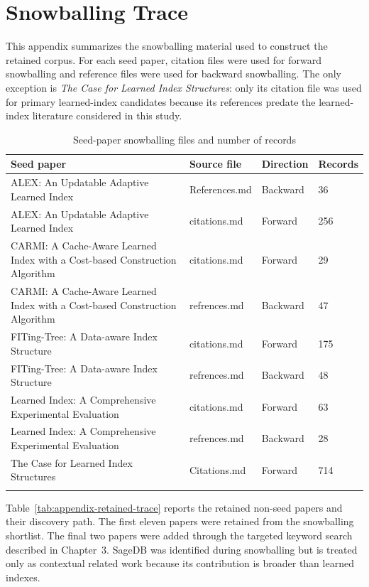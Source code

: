 \documentclass[a4paper, 12pt, twoside]{report}
\begin{document}
\section{Snowballing Trace}

This appendix summarizes the snowballing material used to construct the retained corpus. For each seed paper, citation files were used for forward snowballing and reference files were used for backward snowballing. The only exception is \textit{The Case for Learned Index Structures}: only its citation file was used for primary learned-index candidates because its references predate the learned-index literature considered in this study.

\begin{longtable}{|p{4.4cm}|p{3.5cm}|p{2.2cm}|p{2.2cm}|}
\hline
\textbf{Seed paper} & \textbf{Source file} & \textbf{Direction} & \textbf{Records} \\
\hline
ALEX: An Updatable Adaptive Learned Index & References.md & Backward & 36 \\
\hline
ALEX: An Updatable Adaptive Learned Index & citations.md & Forward & 256 \\
\hline
CARMI: A Cache-Aware Learned Index with a Cost-based Construction Algorithm & citations.md & Forward & 29 \\
\hline
CARMI: A Cache-Aware Learned Index with a Cost-based Construction Algorithm & refrences.md & Backward & 47 \\
\hline
FITing-Tree: A Data-aware Index Structure & citations.md & Forward & 175 \\
\hline
FITing-Tree: A Data-aware Index Structure & refrences.md & Backward & 48 \\
\hline
Learned Index: A Comprehensive Experimental Evaluation & citations.md & Forward & 63 \\
\hline
Learned Index: A Comprehensive Experimental Evaluation & refrences.md & Backward & 28 \\
\hline
The Case for Learned Index Structures & Citations.md & Forward & 714 \\
\hline
\caption{Seed-paper snowballing files and number of records}
\label{tab:appendix-seed-sources}
\end{longtable}

Table~\ref{tab:appendix-retained-trace} reports the retained non-seed papers and their discovery path. The first eleven papers were retained from the snowballing shortlist. The final two papers were added through the targeted keyword search described in Chapter~3. SageDB was identified during snowballing but is treated only as contextual related work because its contribution is broader than learned indexes.
\end{document}
